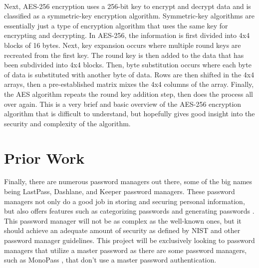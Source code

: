 \documentclass[10pt,twocolumn]{article}
\begin{document}
\paragraph{}
Next, AES-256 encryption uses a 256-bit key to encrypt and decrypt data and is classified as a symmetric-key encryption algorithm. Symmetric-key algorithms are essentially just a type of encryption algorithm that uses the same key for encrypting and decrypting. In AES-256, the information is first divided into 4x4 blocks of 16 bytes. Next, key expansion occurs where multiple round keys are recreated from the first key. The round key is then added to the data that has been subdivided into 4x4 blocks. Then, byte substitution occurs where each byte of data is substituted with another byte of data. Rows are then shifted in the 4x4 arrays, then a pre-established matrix mixes the 4x4 columns of the array. Finally, the AES algorithm repeats the round key addition step, then does the process all over again. This is a very brief and basic overview of the AES-256 encryption algorithm that is difficult to understand, but hopefully gives good insight into the security and complexity of the algorithm.

\section{Prior Work}
Finally, there are numerous password managers out there, some of the big names being LastPass, Dashlane, and Keeper password managers. These password managers not only do a good job in storing and securing personal information, but also offers features such as categorizing passwords and generating passwords \cite{alodhyani_theodorakopoulos_reinecke_2020}. This password manager will not be as complex as the well-known ones, but it should achieve an adequate amount of security as defined by NIST and other password manager guidelines. This project will be exclusively looking to password managers that utilize a master password as there are some password managers, such as MonoPass \cite{jeong_jung_2021}, that don't use a master password authentication.
\end{document}
